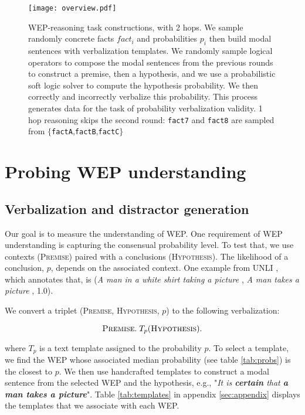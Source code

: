 \documentclass[11pt]{article}
\begin{document}
\begin{figure*}
 \centering
\texttt{[image: overview.pdf]}
  \caption{WEP-reasoning task constructions, with 2 hops.
  We sample randomly concrete facts $fact_i$ and probabilities $p_i$  then build modal sentences with verbalization templates. We randomly sample logical operators to compose the modal sentences from the previous rounds to construct a premise, then a hypothesis, and we use a probabilistic soft logic solver to compute the hypothesis probability. We then correctly and incorrectly verbalize this probability. This process generates data for the task of probability verbalization validity.  1 hop reasoning skips the second round: \texttt{fact7} and \texttt{fact8} are sampled from $\{$\texttt{factA},\texttt{factB},\texttt{factC}$\}$}
  
\label{fig:overview} 
\end{figure*}

\section{Probing WEP understanding}
\subsection{Verbalization and distractor generation \label{sec:verbalization}}

Our goal is to measure the understanding of WEP. One requirement of WEP understanding is capturing the consensual probability level. To test that, we use contexts (\textsc{Premise}) paired with a conclusions (\textsc{Hypothesis}). The likelihood of a conclusion, $p$, depends on the associated context. One example from UNLI \citep{chen-etal-2020-uncertain}, which annotates that, is (\textit{A man in a white shirt taking a picture
}, \textit{A man takes a picture }, 1.0). 

We convert a triplet (\textsc{Premise}, \textsc{Hypothesis}, $p$)
to the following verbalization:\vspace{-3mm}

\begin{equation}
    \textsc{Premise}.\;  T_p(\textsc{Hypothesis}). \vspace{-1mm}
\end{equation}

where  $T_p$ is a text template assigned to the probability $p$. To select a template, we find the WEP whose associated median probability (see table \ref{tab:probs}) is the closest to $p$. We then use handcrafted templates to construct a modal sentence from the selected WEP and the hypothesis, e.g., "\textit{It is  \textbf{certain} that \textbf{a man takes a picture}}". Table \ref{tab:templates} in appendix \ref{sec:appendix} displays the templates that we associate with each WEP. 
\end{document}
